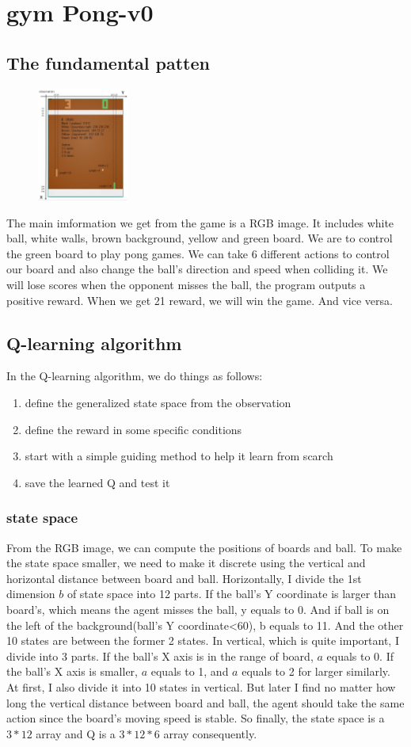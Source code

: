 \documentclass[aps,letterpaper,10pt]{revtex4}
\begin{document}
\section{gym Pong-v0}
\subsection{The fundamental patten}
\begin{figure}
\includegraphics[width=3cm,clip]{pongv2.jpg}
\end{figure}
The main imformation we get from the game is a RGB image. 
It includes white ball, white walls, brown background, yellow and green board. 
We are to control the green board to play pong games. We can take 6 different actions to 
control our board and also change the ball's direction and speed when colliding it. We will lose 
scores when the opponent misses the ball, the program outputs a positive reward. When we get 21 reward, we will win the game. 
And vice versa. 
\subsection{Q-learning algorithm}
In the Q-learning algorithm, we do things as follows:
\begin{enumerate}
\item define the generalized state space from the observation
\item define the reward in some specific conditions
\item start with a simple guiding method to help it learn from scarch
\item save the learned Q and test it
\end{enumerate}
\subsubsection{state space}
From the RGB image, we can compute the positions of boards and ball. 
To make the state space smaller, we need to make it discrete using the vertical and horizontal distance between 
board and ball. Horizontally, I divide the 1st dimension $b$ of state space into 12 parts. If the ball's Y coordinate is larger than 
board's, which means the agent misses the ball, y equals to 0. And if ball is on the left of the background(ball's Y coordinate<60), b equals to 11. 
And the other 10 states are between the former 2 states. In vertical, which is quite important, I divide into 3 parts. If the ball's X axis is in the range of 
board, $a$ equals to 0. If the ball's X axis is smaller, $a$ equals to 1, and $a$ equals to 2 for larger similarly. At first, I also divide it into 10 states in vertical. 
But later I find no matter how long the vertical distance between board and ball, the agent should take the same action since the board's moving speed is stable. So finally, the state space is a $3*12$ array and Q is a $3*12*6$ array consequently.  
\end{document}
